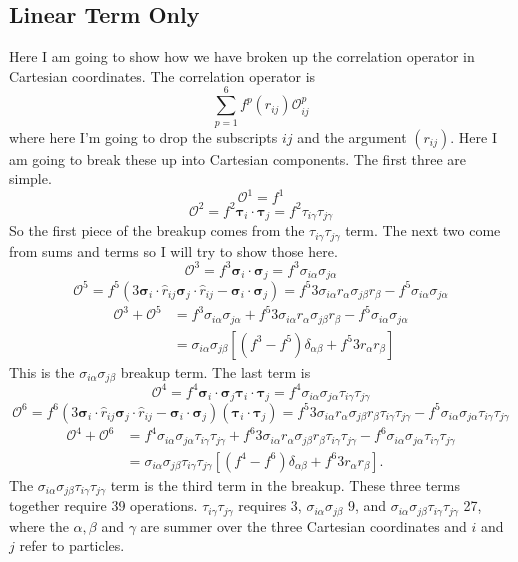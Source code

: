 \documentclass[12pt]{extarticle}
\newcommand{\Oijp}{\mathcal{O}^p_{ij}}
\newcommand{\taui}{\bm{\tau}_i}
\newcommand{\tauj}{\bm{\tau}_j}
\newcommand{\sigmai}{\bm{\sigma}_i}
\newcommand{\sigmaj}{\bm{\sigma}_j}
\newcommand{\rij}{\hat{r}_{ij}}
\newcommand{\sigmaia}{\sigma_{i\alpha}}
\newcommand{\tauig}{\tau_{i\gamma}}
\newcommand{\sigmaja}{\sigma_{j\alpha}}
\newcommand{\sigmajb}{\sigma_{j\beta}}
\newcommand{\taujg}{\tau_{j\gamma}}
\begin{document}
\subsection{Linear Term Only}
Here I am going to show how we have broken up the correlation operator in Cartesian coordinates. The correlation operator is
\begin{equation}
  \sum_{p=1}^6 f^p(r_{ij}) \Oijp
\end{equation}
where here I'm going to drop the subscripts $ij$ and the argument $(r_{ij})$. Here I am going to break these up into Cartesian components. The first three are simple.
\begin{equation}
  \mathcal{O}^1 = f^1
  \label{equ:central}
\end{equation}
\begin{equation}
  \mathcal{O}^2 = f^2 \taui \cdot \tauj = f^2 \tauig \taujg
  \label{equ:At}
\end{equation}
So the first piece of the breakup comes from the $\tauig \taujg$ term. The next two come from sums and terms so I will try to show those here.
\begin{equation}
  \mathcal{O}^3 = f^3\sigmai\cdot\sigmaj = f^3\sigmaia\sigmaja
\end{equation}
\begin{equation}
  \mathcal{O}^5 = f^5 \left( 3\sigmai\cdot\rij\sigmaj\cdot\rij - \sigmai\cdot\sigmaj \right) = f^5 3\sigmaia r_\alpha\sigmajb r_\beta - f^5 \sigmaia\sigmaja
\end{equation}
\begin{align}
  \mathcal{O}^3 + \mathcal{O}^5 &= f^3 \sigmaia\sigmaja + f^5 3\sigmaia r_\alpha\sigmajb r_\beta - f^5 \sigmaia\sigmaja \\
  &= \sigmaia\sigmajb \left[ (f^3-f^5)\delta_{\alpha\beta} + f^5 3r_\alpha r_\beta \right]
  \label{equ:As}
\end{align}
This is the $\sigmaia\sigmajb$ breakup term. The last term is
\begin{equation}
  \mathcal{O}^4 = f^4\sigmai\cdot\sigmaj\taui\cdot\tauj = f^4\sigmaia\sigmaja\tauig\taujg
\end{equation}
\begin{equation}
  \mathcal{O}^6 = f^6 \left( 3\sigmai\cdot\rij\sigmaj\cdot\rij - \sigmai\cdot\sigmaj \right)(\taui\cdot\tauj) = f^5 3\sigmaia r_\alpha\sigmajb r_\beta\tauig\taujg - f^5 \sigmaia\sigmaja\tauig\taujg
\end{equation}
\begin{align}
  \mathcal{O}^4 + \mathcal{O}^6 &= f^4 \sigmaia\sigmaja\tauig\taujg + f^6 3\sigmaia r_\alpha\sigmajb r_\beta\tauig\taujg - f^6 \sigmaia\sigmaja\tauig\taujg \\
  &= \sigmaia\sigmajb\tauig\taujg \left[ (f^4-f^6)\delta_{\alpha\beta} + f^6 3r_\alpha r_\beta \right].
  \label{equ:Ast}
\end{align}
The $\sigmaia\sigmajb\tauig\taujg$ term is the third term in the breakup. These three terms together require 39 operations. $\tauig\taujg$ requires 3, $\sigmaia\sigmajb$ 9, and $\sigmaia\sigmajb\tauig\taujg$ 27, where the $\alpha, \beta$ and $\gamma$ are summer over the three Cartesian coordinates and $i$ and $j$ refer to particles.
\end{document}
